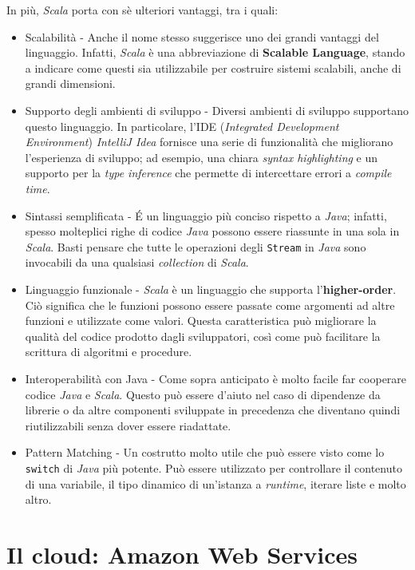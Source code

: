 In più, \textit{Scala} porta con sè ulteriori vantaggi, tra i quali:
\begin{itemize}
    \item Scalabilità - Anche il nome stesso suggerisce uno dei grandi vantaggi del linguaggio.
    Infatti, \textit{Scala} è una abbreviazione di \textbf{Scalable Language}, stando a indicare come questi sia utilizzabile per costruire sistemi scalabili, anche di grandi dimensioni.
    \item Supporto degli ambienti di sviluppo - Diversi ambienti di sviluppo supportano questo linguaggio.
    In particolare, l'IDE (\textit{Integrated Development Environment}) \textit{IntelliJ Idea} fornisce una serie di funzionalità che migliorano l'esperienza di sviluppo;
    ad esempio, una chiara \textit{syntax highlighting} e un supporto per la \textit{type inference} che permette di intercettare errori a \textit{compile time}.
    \item Sintassi semplificata - É un linguaggio più conciso rispetto a \textit{Java};
    infatti, spesso molteplici righe di codice \textit{Java} possono essere riassunte in una sola in \textit{Scala}.
    Basti pensare che tutte le operazioni degli \texttt{Stream} in \textit{Java} sono invocabili da una qualsiasi \textit{collection} di \textit{Scala}.
    \item Linguaggio funzionale - \textit{Scala} è un linguaggio che supporta l'\textbf{higher-order}.
    Ciò significa che le funzioni possono essere passate come argomenti ad altre funzioni e utilizzate come valori.
    Questa caratteristica può migliorare la qualità del codice prodotto dagli sviluppatori, così come può facilitare la scrittura di algoritmi e procedure.
    \item Interoperabilità con Java - Come sopra anticipato è molto facile far cooperare codice \textit{Java} e \textit{Scala}.
    Questo può essere d'aiuto nel caso di dipendenze da librerie o da altre componenti sviluppate in precedenza che diventano quindi riutilizzabili senza dover essere riadattate.
    \item Pattern Matching - Un costrutto molto utile che può essere visto come lo \texttt{switch} di \textit{Java} più potente.
    Può essere utilizzato per controllare il contenuto di una variabile, il tipo dinamico di un'istanza a \textit{runtime}, iterare liste e molto altro.
\end{itemize}

\section{Il cloud: Amazon Web Services}\label{sec:aws}

